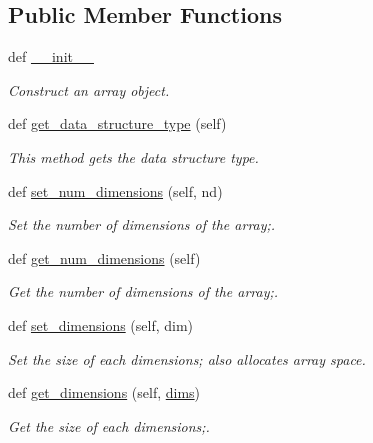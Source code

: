 \subsection*{Public Member Functions}
\begin{DoxyCompactItemize}
\item 
def \hyperlink{class_bridges_1_1_array_1_1_array_a3e0f4ea978dc38f6e42f1ee3d4e7ebb4}{\+\_\+\+\_\+init\+\_\+\+\_\+}
\begin{DoxyCompactList}\small\item\em Construct an array object. \end{DoxyCompactList}\item 
def \hyperlink{class_bridges_1_1_array_1_1_array_a214847a9e90416f2ae0e14a02aa6376f}{get\+\_\+data\+\_\+structure\+\_\+type} (self)
\begin{DoxyCompactList}\small\item\em This method gets the data structure type. \end{DoxyCompactList}\item 
def \hyperlink{class_bridges_1_1_array_1_1_array_ab85706a4fe954ec7620cd19d076a60d1}{set\+\_\+num\+\_\+dimensions} (self, nd)
\begin{DoxyCompactList}\small\item\em Set the number of dimensions of the array;. \end{DoxyCompactList}\item 
def \hyperlink{class_bridges_1_1_array_1_1_array_afa88ea678d74409768912cbb4026b65e}{get\+\_\+num\+\_\+dimensions} (self)
\begin{DoxyCompactList}\small\item\em Get the number of dimensions of the array;. \end{DoxyCompactList}\item 
def \hyperlink{class_bridges_1_1_array_1_1_array_a496265932c2d4eeefd3605210afb93f9}{set\+\_\+dimensions} (self, dim)
\begin{DoxyCompactList}\small\item\em Set the size of each dimensions; also allocates array space. \end{DoxyCompactList}\item 
def \hyperlink{class_bridges_1_1_array_1_1_array_a7ad57c2bd46d18fbff99dd19cd88ba68}{get\+\_\+dimensions} (self, \hyperlink{class_bridges_1_1_array_1_1_array_a309aee1788e19f49aff298155b9b7c39}{dims})
\begin{DoxyCompactList}\small\item\em Get the size of each dimensions;. \end{DoxyCompactList}\item 

\end{DoxyCompactItemize}
